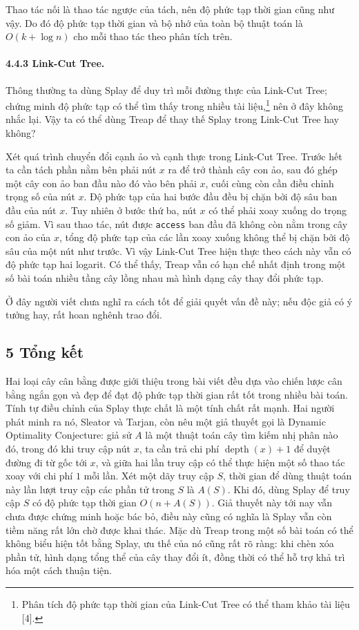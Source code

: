 \documentclass[11pt]{article}
\begin{document}
Thao tác nối là thao tác ngược của tách, nên độ phức tạp thời gian cũng như
vậy. Do đó độ phức tạp thời gian và bộ nhớ của toàn bộ thuật toán là
\(O(k+\log n)\) cho mỗi thao tác theo phân tích trên.

\paragraph{4.4.3 Link-Cut Tree.}
Thông thường ta dùng Splay để duy trì mỗi đường thực của Link-Cut Tree; chứng
minh độ phức tạp có thể tìm thấy trong nhiều tài liệu,\footnote{Phân tích độ
phức tạp thời gian của Link-Cut Tree có thể tham khảo tài liệu [4].} nên ở đây
không nhắc lại. Vậy ta có thể dùng Treap để thay thế Splay trong Link-Cut Tree
hay không?

Xét quá trình chuyển đổi cạnh ảo và cạnh thực trong Link-Cut Tree. Trước hết ta
cần tách phần nằm bên phải nút \(x\) ra để trở thành cây con ảo, sau đó ghép
một cây con ảo ban đầu nào đó vào bên phải \(x\), cuối cùng còn cần điều chỉnh
trọng số của nút \(x\). Độ phức tạp của hai bước đầu đều bị chặn bởi độ sâu ban
đầu của nút \(x\). Tuy nhiên ở bước thứ ba, nút \(x\) có thể phải xoay xuống do
trọng số giảm. Vì sau thao tác, nút được \texttt{access} ban đầu đã không còn
nằm trong cây con ảo của \(x\), tổng độ phức tạp của các lần xoay xuống không
thể bị chặn bởi độ sâu của một nút như trước. Vì vậy Link-Cut Tree hiện thực
theo cách này vẫn có độ phức tạp hai logarit. Có thể thấy, Treap vẫn có hạn chế
nhất định trong một số bài toán nhiều tầng cây lồng nhau mà hình dạng cây thay
đổi phức tạp.

Ở đây người viết chưa nghĩ ra cách tốt để giải quyết vấn đề này; nếu độc giả
có ý tưởng hay, rất hoan nghênh trao đổi.

\subsection*{5 Tổng kết}

Hai loại cây cân bằng được giới thiệu trong bài viết đều dựa vào chiến lược cân
bằng ngắn gọn và đẹp để đạt độ phức tạp thời gian rất tốt trong nhiều bài toán.
Tính tự điều chỉnh của Splay thực chất là một tính chất rất mạnh. Hai người
phát minh ra nó, Sleator và Tarjan, còn nêu một giả thuyết gọi là Dynamic
Optimality Conjecture: giả sử \(A\) là một thuật toán cây tìm kiếm nhị phân nào
đó, trong đó khi truy cập nút \(x\), ta cần trả chi phí \(\operatorname{depth}(x)+1\)
để duyệt đường đi từ gốc tới \(x\), và giữa hai lần truy cập có thể thực hiện
một số thao tác xoay với chi phí \(1\) mỗi lần. Xét một dãy truy cập \(S\), thời
gian để dùng thuật toán này lần lượt truy cập các phần tử trong \(S\) là
\(A(S)\). Khi đó, dùng Splay để truy cập \(S\) có độ phức tạp thời gian
\(O(n+A(S))\). Giả thuyết này tới nay vẫn chưa được chứng minh hoặc bác bỏ,
điều này cũng có nghĩa là Splay vẫn còn tiềm năng rất lớn chờ được khai thác.
Mặc dù Treap trong một số bài toán có thể không biểu hiện tốt bằng Splay, ưu
thế của nó cũng rất rõ ràng: khi chèn xóa phần tử, hình dạng tổng thể của cây
thay đổi ít, đồng thời có thể hỗ trợ khả trì hóa một cách thuận tiện.
\end{document}
